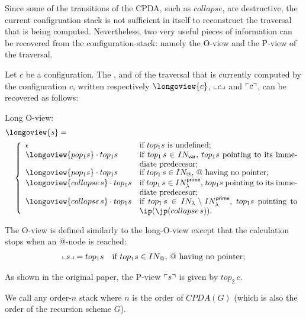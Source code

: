 \documentclass[a4paper,draft]{article}
\theoremstyle{remark}
\theoremstyle{definition}
\newcommand\INodes{IN}%
\begin{document}
Since some of the transitions of the CPDA, such as $collapse$, are destructive, the current configruation stack
is not sufficient in itself to reconstruct the traversal that is being computed.
Nevertheless, two very useful pieces of information can be recovered from the configuration-stack: namely the O-view and the P-view of the traversal.

Let $c$ be a configuration. The ,
 and  of the traversal that is currently computed by the configuration $c$, written respectively $\longoview{c}$, $\llcorner c \lrcorner$ and $\ulcorner c \urcorner$, can be recovered as follows:
\begin{compactitem}
\item Long O-view:
\begin{align*}
&  \longoview{s} = \\
 & \quad \left\{
  \begin{array}{ll}
      \epsilon & \mbox{if $top_1 s$ is undefined;} \\
      \longoview{pop_1 s} \cdot top_1 s & \parbox[t]{7cm}{if $top_1\,s \in \INodes_{\sf var}$, $top_1 s$ pointing to its immediate predecesor;} \\
      \longoview{pop_1 s} \cdot top_1 s & \mbox{if $top_1\,s \in \INodes_@$, $@$ having no pointer;} \\
      \longoview{collapse\,s} \cdot top_1 s & \parbox[t]{7cm}{if $top_1\,s \in \INodes_\lambda^{\sf prime}$, $top_1 s$ pointing to its immediate predecesor;} \\
      \longoview{collapse\,s} \cdot top_1 s & \parbox[t]{7cm}{if $top_1\,s \in \INodes_\lambda\setminus \INodes_\lambda^{\sf prime}$, $top_1 s$ pointing to $\ip(\jp(collapse\,s))$.}
    \end{array}
      \right. 
\end{align*}
\item The O-view is defined similarly to the long-O-view except that the calculation stops when an @-node is reached:
\begin{align*}
  \oview{s}  &=   top_1 s & \mbox{if $top_1 s \in \INodes_@$, $@$ having no pointer;}
\end{align*}
\item As shown in the original paper, the P-view $\ulcorner s \urcorner$ is given by $top_2\,c$.
\end{compactitem}
\bigskip

We call  any order-$n$ stack where $n$ is the order
of $CPDA(G)$ (which is also the order of the recursion scheme $G$).
\end{document}
